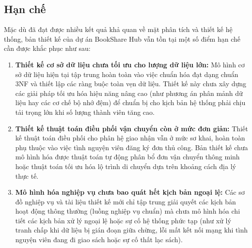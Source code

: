 \subsection{Hạn chế}

Mặc dù đã đạt được nhiều kết quả khả quan về mặt phân tích và thiết kế hệ thống, bản thiết kế của dự án BookShare Hub vẫn tồn tại một số điểm hạn chế cần được khắc phục như sau:

\begin{enumerate}
    \item \textbf{Thiết kế cơ sở dữ liệu chưa tối ưu cho lượng dữ liệu lớn:} Mô hình cơ sở dữ liệu hiện tại tập trung hoàn toàn vào việc chuẩn hóa đạt dạng chuẩn 3NF và thiết lập các ràng buộc toàn vẹn dữ liệu. Thiết kế này chưa xây dựng các giải pháp tối ưu hóa hiệu năng nâng cao (như phương án phân mảnh dữ liệu hay các cơ chế bộ nhớ đệm) để chuẩn bị cho kịch bản hệ thống phải chịu tải trọng lớn khi số lượng thành viên tăng cao.
    \item \textbf{Thiết kế thuật toán điều phối vận chuyển còn ở mức đơn giản:} Thiết kế thuật toán điều phối cho phân hệ giao nhận vẫn ở mức sơ khai, hoàn toàn phụ thuộc vào việc tình nguyện viên đăng ký đơn thủ công. Bản thiết kế chưa mô hình hóa được thuật toán tự động phân bổ đơn vận chuyển thông minh hoặc thuật toán tối ưu hóa lộ trình di chuyển dựa trên khoảng cách địa lý thực tế.
    \item \textbf{Mô hình hóa nghiệp vụ chưa bao quát hết kịch bản ngoại lệ:} Các sơ đồ nghiệp vụ và tài liệu thiết kế mới chỉ tập trung giải quyết các kịch bản hoạt động thông thường (luồng nghiệp vụ chuẩn) mà chưa mô hình hóa chi tiết các kịch bản xử lý ngoại lệ hoặc sự cố hệ thống phức tạp (như xử lý tranh chấp khi dữ liệu bị gián đoạn giữa chừng, lỗi mất kết nối mạng khi tình nguyện viên đang đi giao sách hoặc sự cố thất lạc sách).
\end{enumerate}


